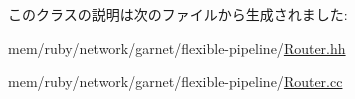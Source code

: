このクラスの説明は次のファイルから生成されました:\begin{DoxyCompactItemize}
\item 
mem/ruby/network/garnet/flexible-\/pipeline/\hyperlink{Router_8hh}{Router.hh}\item 
mem/ruby/network/garnet/flexible-\/pipeline/\hyperlink{Router_8cc}{Router.cc}\end{DoxyCompactItemize}

